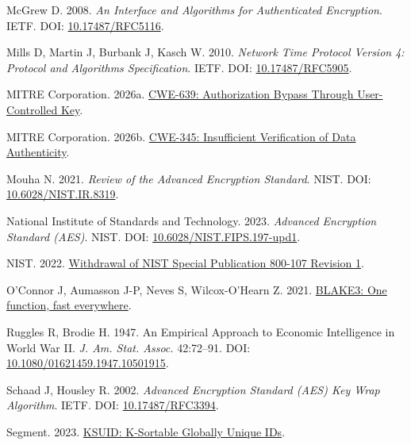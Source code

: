 \documentclass[fleqn,10pt]{wlpeerj}
\newlength{\cslhangindent}
\newenvironment{CSLReferences}[2]
 {\begin{list}{}{%
  \setlength{\itemindent}{0pt}
  \setlength{\leftmargin}{0pt}
  \setlength{\parsep}{0pt}
  \ifodd #1
   \setlength{\leftmargin}{\cslhangindent}
   \setlength{\itemindent}{-1\cslhangindent}
  \fi
  \setlength{\itemsep}{#2\baselineskip}}}
 {\end{list}}
\begin{document}
\begin{CSLReferences}{1}{0}
McGrew D. 2008. \emph{{An Interface and Algorithms for Authenticated
Encryption}}. IETF. DOI:
\href{https://doi.org/10.17487/RFC5116}{10.17487/RFC5116}.

Mills D, Martin J, Burbank J, Kasch W. 2010. \emph{{Network Time
Protocol Version 4: Protocol and Algorithms Specification}}. IETF. DOI:
\href{https://doi.org/10.17487/RFC5905}{10.17487/RFC5905}.

MITRE Corporation. 2026a.
\href{https://cwe.mitre.org/data/definitions/639.html}{{CWE-639:
Authorization Bypass Through User-Controlled Key}}.

MITRE Corporation. 2026b.
\href{https://cwe.mitre.org/data/definitions/345.html}{{CWE-345:
Insufficient Verification of Data Authenticity}}.

Mouha N. 2021. \emph{{Review of the Advanced Encryption Standard}}.
NIST. DOI:
\href{https://doi.org/10.6028/NIST.IR.8319}{10.6028/NIST.IR.8319}.

National Institute of Standards and Technology. 2023. \emph{{Advanced
Encryption Standard (AES)}}. NIST. DOI:
\href{https://doi.org/10.6028/NIST.FIPS.197-upd1}{10.6028/NIST.FIPS.197-upd1}.

NIST. 2022.
\href{https://csrc.nist.gov/news/2022/withdrawal-of-nist-sp-800-107-revision-1}{{Withdrawal
of NIST Special Publication 800-107 Revision 1}}.

O'Connor J, Aumasson J-P, Neves S, Wilcox-O'Hearn Z. 2021.
\href{https://github.com/BLAKE3-team/BLAKE3-specs/blob/ac78a717924dd9e6f16f547baa916c6f71470b1a/blake3.pdf}{{BLAKE3:
One function, fast everywhere}}.

Ruggles R, Brodie H. 1947. {An Empirical Approach to Economic
Intelligence in World War II}. \emph{J. Am. Stat. Assoc.} 42:72--91.
DOI:
\href{https://doi.org/10.1080/01621459.1947.10501915}{10.1080/01621459.1947.10501915}.

Schaad J, Housley R. 2002. \emph{{Advanced Encryption Standard (AES) Key
Wrap Algorithm}}. IETF. DOI:
\href{https://doi.org/10.17487/RFC3394}{10.17487/RFC3394}.

Segment. 2023.
\href{https://github.com/segmentio/ksuid/blob/d33724947fcfba7949906c2b1821e96a1c8d06e7/README.md}{{KSUID:
K-Sortable Globally Unique IDs}}.


\end{CSLReferences}
\end{document}
